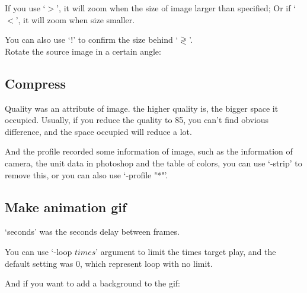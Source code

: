 \documentclass[12pt]{article}
\begin{document}
If you use `$>$', it will zoom when the size of image larger than specified; Or if `$<$', it will zoom when size smaller.

You can also use `!' to confirm the size behind `$\gtrless$'.\\

Rotate the source image in a certain angle:\vspace{5mm}

{\centering{}\par}

\subsection{Compress}
{\centering{}\par}\vspace{5mm}

Quality was an attribute of image. the higher quality is, the bigger space it occupied. Usually, if you reduce the quality to 85, you can't find obvious difference, and the space occupied will reduce a lot.

And the profile recorded some information of image, such as the information of camera, the unit data in photoshop and the table of colors, you can use `-strip' to remove this, or you can also use `-profile "*"'.

\subsection{Make animation gif}
{\centering{}\par}\vspace{5mm}

`seconds' was the seconds delay between frames.

You can use `-loop $times$' argument to limit the times target play, and the default setting was 0, which represent loop with no limit.

And if you want to add a background to the gif:\vspace{5mm}

{\centering{}\par} \vspace{5mm}
\end{document}
